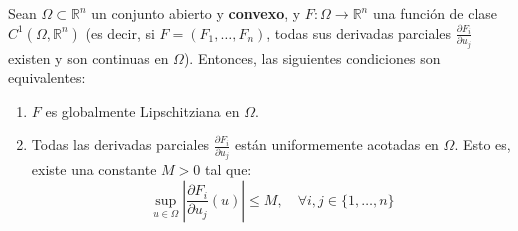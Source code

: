 \begin{teorema}
    Sean $\Omega \subset \mathbb{R}^n$ un conjunto abierto y \textbf{convexo}, y $F : \Omega \to \mathbb{R}^n$ una función de clase $C^1(\Omega, \mathbb{R}^n)$ (es decir, si $F = (F_1, \ldots, F_n)$, todas sus derivadas parciales $\frac{\partial F_i}{\partial u_j}$ existen y son continuas en $\Omega$). Entonces, las siguientes condiciones son equivalentes:
    \begin{enumerate}
        \item $F$ es globalmente Lipschitziana en $\Omega$.
        \item Todas las derivadas parciales $\frac{\partial F_i}{\partial u_j}$ están uniformemente acotadas en $\Omega$. Esto es, existe una constante $M > 0$ tal que:
        \[
            \sup_{u \in \Omega} \left| \frac{\partial F_i}{\partial u_j}(u) \right| \leq M, \quad \forall i,j \in \{1, \ldots, n\}
        \]
    \end{enumerate}
\end{teorema}

